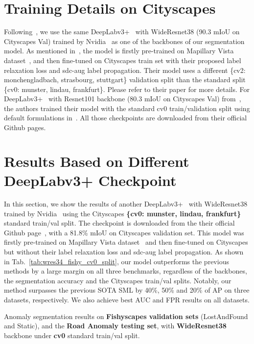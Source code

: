 \documentclass[runningheads]{llncs}
\begin{document}
\section{Training Details on Cityscapes}
Following~\cite{chan2021entropy,chan2021segmentmeifyoucan}, we use the same DeepLabv3+~\cite{chen2018encoder} with WideResnet38 (90.3 mIoU on Cityscapes Val) trained by Nvidia~\cite{zhu2019improving} as one of the backbones of our segmentation model. 
As mentioned in~\cite{zhu2019improving}, the model is firstly pre-trained on Mapillary Vista dataset~\cite{neuhold2017mapillary}, and then fine-tuned on Cityscapes train set with their proposed label relaxation loss and sdc-aug label propagation. 
Their model uses a different \{cv2: monchengladbach, strasbourg, stuttgart\} validation split than the standard split \{cv0: munster, lindau, frankfurt\}. Please refer to their paper for more details. 
For DeepLabv3+~\cite{chen2018encoder} with Resnet101 backbone (80.3 mIoU on Cityscapes Val) from~\cite{jung2021standardized}, the authors trained their model with the standard cv0 train/validation split using default formulations in~\cite{chen2018encoder}. All those checkpoints are downloaded from their official Github pages. 



\section{Results Based on Different DeepLabv3+ Checkpoint}
In this section, we show the results of another DeepLabv3+~\cite{chen2018encoder} with WideResnet38 trained by Nvidia~\cite{zhu2019improving} using the Cityscapes \textbf{\{cv0: munster, lindau, frankfurt\}} standard train/val split. The checkpoint is downloaded from the their official Github page~\cite{zhu2019improving}, with a 81.8\% mIoU on Cityscapes validation set. This model was firstly pre-trained on Mapillary Vista dataset~\cite{neuhold2017mapillary} and then fine-tuned on Cityscapes but without their label relaxation loss and sdc-aug label propagation.  As shown in Tab.~\ref{tab:wres34_fishy_cv0_split}, our model outperforms the previous methods by a large margin on all three benchmarks, regardless of the backbones, the segmentation accuracy and the Cityscapes train/val splits. Notably, our method surpasses the previous SOTA SML by 40\%, 50\% and 20\% of AP on three datasets, respectively. We also achieve best AUC and FPR results on all datasets. 

\begin{table*}[!t]
\centering
\caption{Anomaly segmentation results on \textbf{Fishyscapes validation sets} (LostAndFound and Static), and the \textbf{Road Anomaly testing set}, with \textbf{WideResnet38} backbone under \textbf{cv0} standard train/val split.}
\label{tab:wres34_fishy_cv0_split}
\end{table*}
\end{document}
